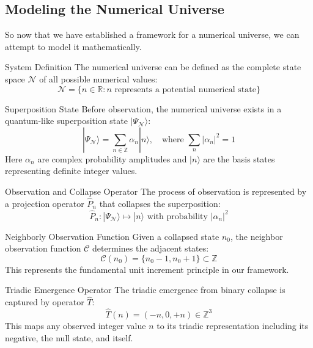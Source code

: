 \documentclass[11pt]{article}
\newcommand{\bbR}{\mathbb{R}}
\newcommand{\be}{\begin{equation}}
\newcommand{\ee}{\end{equation}}
\begin{document}
    \subsection{Modeling the Numerical Universe}
        \hspace{1em}
        So now that we have established a framework for a numerical universe, we can attempt to model it mathematically.

        \begin{postulate}{System Definition}
            The numerical universe can be defined as the complete state space $\mathcal{N}$ of all possible numerical values:
            \be
                \mathcal{N} = \{n \in \bbR : n \text{ represents a potential numerical state}\}
            \ee
        \end{postulate}

        \begin{postulate}{Superposition State}
            Before observation, the numerical universe exists in a quantum-like superposition state $|\Psi_{\mathcal{N}}\rangle$:
            \be
                |\Psi_{\mathcal{N}}\rangle = \sum_{n \in \mathbb{Z}} \alpha_n |n\rangle, \quad \text{where } \sum_{n} |\alpha_n|^2 = 1
            \ee
            Here $\alpha_n$ are complex probability amplitudes and $|n\rangle$ are the basis states representing definite integer values.
        \end{postulate}

        \begin{postulate}{Observation and Collapse Operator}
            The process of observation is represented by a projection operator $\hat{P}_n$ that collapses the superposition:
            \be
                \hat{P}_n : |\Psi_{\mathcal{N}}\rangle \mapsto |n\rangle \text{ with probability } |\alpha_n|^2
            \ee
        \end{postulate}

        \begin{postulate}{Neighborly Observation Function}
            Given a collapsed state $n_0$, the neighbor observation function $\mathcal{C}$ determines the adjacent states:
            \be
                \mathcal{C}(n_0) = \{n_0 - 1, n_0 + 1\} \subset \mathbb{Z}
            \ee
            This represents the fundamental unit increment principle in our framework.
        \end{postulate}

        \begin{postulate}{Triadic Emergence Operator}
            The triadic emergence from binary collapse is captured by operator $\hat{T}$:
            \be
                \hat{T}(n) = (-n, 0, +n) \in \mathbb{Z}^3
            \ee
            This maps any observed integer value $n$ to its triadic representation including its negative, the null state, and itself.
        \end{postulate}
\end{document}
